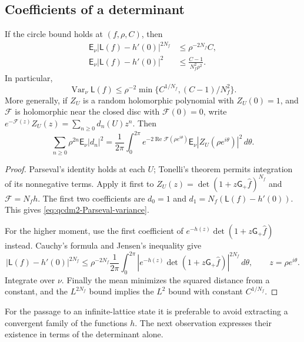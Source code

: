 \documentclass[11pt,letterpaper,reqno]{amsart}
\makeatletter
\theoremstyle{definition}
\newcommand{\ms@minorstart}{%
  \pushQED{\qed}\renewcommand{\qedsymbol}{$\blacksquare$}}
\newenvironment{proposition}[1][]{\ms@minorstart\ms@proposition[#1]}
  {\popQED\endms@proposition}
\theoremstyle{remark}
\makeatother
\begin{document}
\subsection{Coefficients of a determinant}

\begin{proposition}\label{C-414-11}
If the circle bound holds at $(f,\rho,C)$, then
\begin{align}
 \mathsf E_\nu|\mathsf L(f)-h'(0)|^{2N_f}
       &\le \rho^{-2N_f}C,\label{eq:qcdm2-high-moment}\\
 \mathsf E_\nu|\mathsf L(f)-h'(0)|^2
       &\le \frac{C-1}{N_f^2\rho^2}.
       \label{eq:qcdm2-Parseval-variance}
\end{align}
In particular,
\[
 \operatorname{Var}_\nu\mathsf L(f)
 \le\rho^{-2}\min\{C^{1/N_f},(C-1)/N_f^2\}.
\]
More generally, if $Z_U$ is a random holomorphic polynomial with
$Z_U(0)=1$, and $\mathcal F$ is holomorphic near the closed disc
with $\mathcal F(0)=0$, write
$e^{-\mathcal F(z)}Z_U(z)=\sum_{n\ge0}d_n(U)z^n$.  Then
\begin{equation}\label{eq:qcdm2-Parseval}
 \sum_{n\ge0}\rho^{2n}\mathsf E_\nu|d_n|^2
 =\frac1{2\pi}\int_0^{2\pi}
       e^{-2\operatorname{Re}\mathcal F(\rho e^{i\theta})}
       \mathsf E_\nu|Z_U(\rho e^{i\theta})|^2\,d\theta.
\end{equation}
\end{proposition}

\begin{proof}
Parseval's identity holds at each $U$; Tonelli's theorem permits
integration of its nonnegative terms.  Apply it first to
$Z_U(z)=\det(1+z\mathsf G_+\hat f)^{N_f}$ and
$\mathcal F=N_fh$.  The first two coefficients are
$d_0=1$ and $d_1=N_f(\mathsf L(f)-h'(0))$.  This gives
\eqref{eq:qcdm2-Parseval-variance}.

For the higher moment, use the first coefficient of
$e^{-h(z)}\det(1+z\mathsf G_+\hat f)$ instead.  Cauchy's formula
and Jensen's inequality give
\[
 |\mathsf L(f)-h'(0)|^{2N_f}
 \le\rho^{-2N_f}\frac1{2\pi}\int_0^{2\pi}
 |e^{-h(z)}\det(1+z\mathsf G_+\hat f)|^{2N_f}\,d\theta,
 \qquad z=\rho e^{i\theta}.
\]
Integrate over $\nu$.  Finally the mean minimizes the squared
distance from a constant, and the $L^{2N_f}$ bound implies the
$L^2$ bound with constant $C^{1/N_f}$.
\end{proof}

For the passage to an infinite-lattice state it is preferable to
avoid extracting a convergent family of the functions $h$.
The next observation expresses their existence in terms of the
determinant alone.
\end{document}
